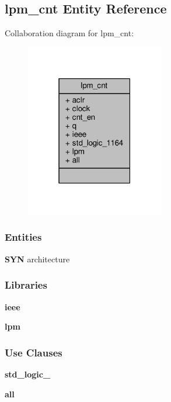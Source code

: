 \subsection{lpm\+\_\+cnt Entity Reference}
\label{classlpm__cnt}


Collaboration diagram for lpm\+\_\+cnt\+:\nopagebreak
\begin{figure}[H]
\begin{center}
\leavevmode
\includegraphics[width=171pt]{d3/d95/classlpm__cnt__coll__graph}
\end{center}
\end{figure}
\subsubsection*{Entities}
\begin{DoxyCompactItemize}
\item 
{\bf S\+YN} architecture
\end{DoxyCompactItemize}
\subsubsection*{Libraries}
 \begin{DoxyCompactItemize}
\item 
{\bf ieee} 
\item 
{\bf lpm} 
\end{DoxyCompactItemize}
\subsubsection*{Use Clauses}
 \begin{DoxyCompactItemize}
\item 
{\bf std\+\_\+logic\+\_}   
\item 
{\bf  all }   
\end{DoxyCompactItemize}
